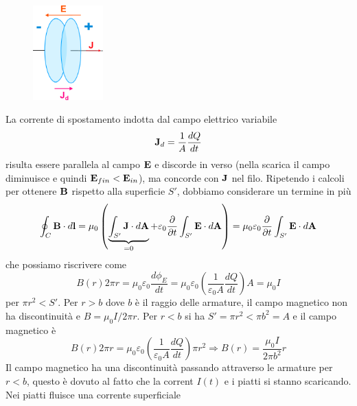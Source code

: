  \begin{figure}  %
    \centering
    \includegraphics[width=0.24\textwidth]{images/parallel_plate1} %
\end{figure}
 La corrente di spostamento indotta dal campo elettrico variabile 
 \begin{equation*}
 	\bold{J}_d = \frac{1}{A} \frac{dQ}{dt}
 \end{equation*}
 risulta essere parallela al campo $\bold{E}$ e discorde in verso (nella scarica il campo diminuisce e quindi $\bold{E}_{fin} < \bold{E}_{in}$), ma concorde con $\bold{J}$ nel filo. Ripetendo i calcoli per ottenere $\bold{B}$ rispetto alla superficie $S'$, dobbiamo considerare un termine in pi\`u 
 \begin{equation*}
 	\oint_{C} \bold{B} \cdot d\bold{l} = \mu_0 \left( \underbrace{\int_{S'} \bold{J} \cdot d\bold{A}}_{=0} +  \varepsilon_0 \frac{\partial }{\partial t} \int_{S'} \bold{E} \cdot d \bold{A}\right) = \mu_0 \varepsilon_0 \frac{\partial }{\partial t} \int_{S'} \bold{E} \cdot d\bold{A}
 \end{equation*}
 che possiamo riscrivere come 
 \begin{equation*}
 	B(r) 2 \pi r = \mu_0 \varepsilon_0 \frac{d \phi_E}{dt} = \mu_0 \varepsilon_0 \left(\frac{1}{\varepsilon_0 A} \frac{dQ}{dt}\right)A = \mu_0 I
 \end{equation*}
 per $\pi r^2 < S'$. Per $r>b$ dove $b$ \`e il raggio delle armature, il campo magnetico non ha discontinuit\`a e $B = \mu_0 I / 2\pi r$. Per $r<b$ si ha $S' = \pi r^2 < \pi b^2 = A$ e il campo  magnetico \`e 
 \begin{equation*}
 	B(r) 2\pi r  = \mu_0 \varepsilon_0 \left(\frac{1}{\varepsilon_0 A}\frac{dQ}{dt}\right)\pi r^2  \Rightarrow B(r) = \frac{\mu_0 I}{2 \pi b^2}r
 \end{equation*}
Il campo magnetico ha una discontinuit\`a passando attraverso le armature per $r<b$, questo \`e dovuto al fatto che la corrent $I(t)$ e i piatti si stanno scaricando. Nei piatti fluisce una corrente superficiale 

